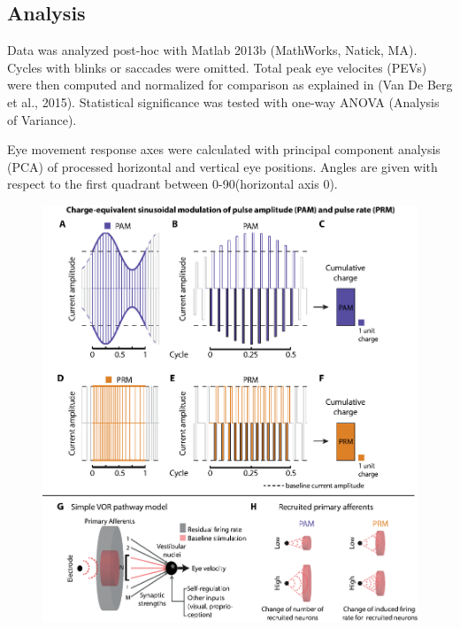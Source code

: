 \subsection{Analysis}
Data was analyzed post-hoc with Matlab 2013b (MathWorks, Natick, MA). Cycles with blinks or saccades were omitted. Total peak eye velocites (PEVs) were then computed and normalized for comparison as explained in (Van De Berg et al., 2015). Statistical significance was tested with one-way ANOVA (Analysis of Variance). 

Eye movement response axes were calculated with principal component analysis (PCA) of processed horizontal and vertical eye positions. Angles are given with respect to the first quadrant between 0-90\degree (horizontal axis 0\degree).

\begin{figure}[btp]
\centering
\includegraphics[height=0.63\textheight]{chapters/partii/pamprm/figures/Fig_pamprm_chargemodel.eps} 

\end{figure}
